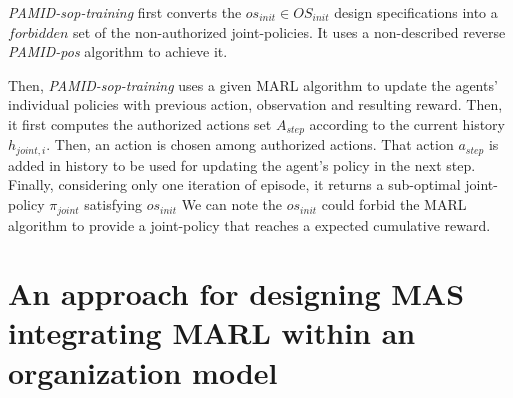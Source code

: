 \documentclass[runningheads]{llncs}
\begin{document}
\emph{PAMID-sop-training} first converts the $os_{init} \in OS_{init}$ design specifications into a $forbidden$ set of the non-authorized joint-policies. It uses a non-described reverse \emph{PAMID-pos} algorithm to achieve it.

Then, \emph{PAMID-sop-training} uses a given MARL algorithm to update the agents' individual policies with previous action, observation and resulting reward. Then, it first computes the authorized actions set $A_{step}$ according to the current history $h_{joint,i}$. Then, an action is chosen among authorized actions. That action $a_{step}$ is added in history to be used for updating the agent's policy in the next step. 
Finally, considering only one iteration of episode, it returns a sub-optimal joint-policy $\pi_{joint}$ satisfying $os_{init}$
We can note the $os_{init}$ could forbid the MARL algorithm to provide a joint-policy that reaches a expected cumulative reward.


\section{An approach for designing MAS integrating MARL within an organization model}




\end{document}
